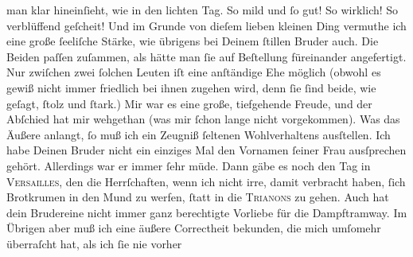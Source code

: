 \begin{ledgroupsized}[t]{13cm}
               man klar hineinſieht, wie in den lichten Tag. So mild {\pb}und ſo gut! So wirklich! So verblüffend geſcheit!
               Und im Grunde von dieſem lieben kleinen Ding vermuthe ich eine große ſeeliſche Stärke, wie übrigens
               bei Deinem ſtillen Bruder
               auch. Die Beiden
               paſſen zuſammen, als hätte man ſie auf Beſtellung füreinander angefertigt. Nur
               zwiſchen zwei ſolchen Leuten iſt eine anſtändige Ehe möglich (obwohl es gewiß nicht
               immer friedlich bei ihnen zugehen wird, denn ſie ſind beide, wie geſagt, ſtolz und
               ſtark.) {\pb}Mir war es eine große, tiefgehende Freude,
               und der Abſchied hat mir wehgethan (was mir ſchon lange nicht vorgekommen).\pend
           \pstart
           Was das Äußere anlangt, ſo muß ich ein Zeugniß ſeltenen Wohlverhaltens ausſtellen.
               Ich habe Deinen Bruder nicht
               ein einziges Mal den Vornamen ſeiner Frau ausſprechen gehört. Allerdings war er immer ſehr müde.
               Dann gäbe es noch den Tag in \textsc{Versailles}, den die Herrſchaften, wenn ich nicht irre, damit verbracht haben, ſich Brotkrumen in
               den Mund zu werfen, ſtatt in die \textsc{Trianons} zu gehen. Auch hat dein Brudereine nicht immer ganz berechtigte Vorliebe für die
               Dampftramway. Im Übrigen aber muß ich  eine\strikeout{\textcolor{gray}{r}} äußere\strikeout{\textcolor{gray}{n}} Correctheit bekunden, die mich umſomehr überraſcht hat, als ich ſie nie vorher

\end{ledgroupsized}
